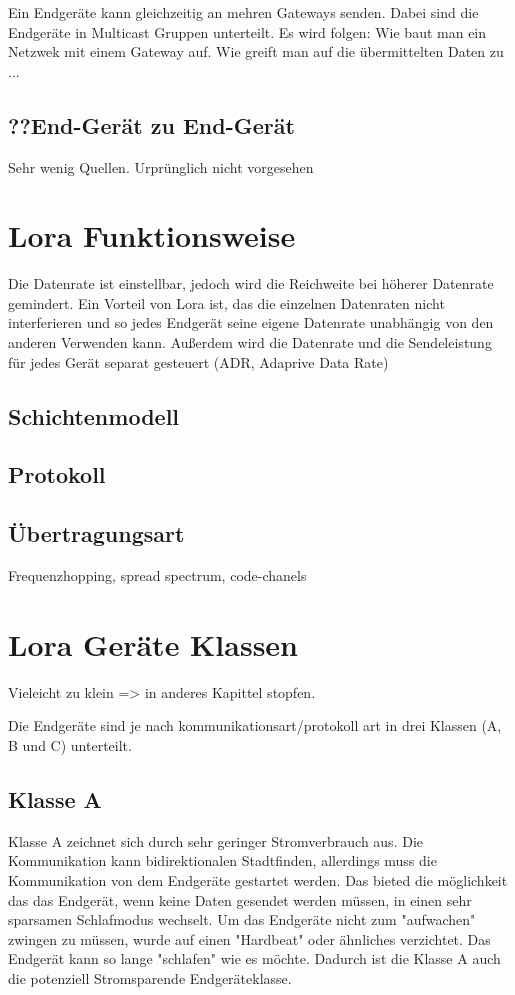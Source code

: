 \documentclass[a4paper,12pt]{article}
\begin{document}
    Ein Endgeräte kann gleichzeitig an mehren Gateways senden. Dabei sind die Endgeräte in Multicast Gruppen unterteilt.
        \cite{TheThing}
        \cite{WhatIsLoRa}
        \cite{LoRaSpec}
        \cite{RFC8376}
    \newline{}\newline{} Es wird folgen: Wie baut man ein Netzwek mit einem Gateway auf. Wie greift man auf die übermittelten Daten zu ...
    \subsection{??End-Gerät zu End-Gerät}
    Sehr wenig Quellen. Urprünglich nicht vorgesehen
    \section{Lora Funktionsweise}
    Die Datenrate ist einstellbar, jedoch wird die Reichweite bei höherer Datenrate gemindert. Ein Vorteil von Lora ist, das die einzelnen Datenraten nicht interferieren und so jedes Endgerät seine eigene Datenrate unabhängig von den anderen Verwenden kann.
    Außerdem wird die Datenrate und die Sendeleistung für jedes Gerät separat gesteuert (ADR, Adaprive Data Rate)
        \cite{RFC8376}
        \cite{LoRaSpec}
    \subsection{Schichtenmodell}
    \subsection{Protokoll}
    \subsection{Übertragungsart}
    Frequenzhopping, spread spectrum, code-chanels
    \section{Lora Geräte Klassen}
    Vieleicht zu klein => in anderes Kapittel stopfen.

    \newline


    Die Endgeräte sind je nach kommunikationsart/protokoll art in drei Klassen (A, B und C) unterteilt. 
        \cite{RFC8376}
        \cite{LoraClasses}
    \subsection{Klasse A}
    Klasse A zeichnet sich durch sehr geringer Stromverbrauch aus. Die Kommunikation kann bidirektionalen Stadtfinden, allerdings muss die Kommunikation von dem Endgeräte gestartet werden. Das bieted die möglichkeit das das Endgerät, wenn keine Daten gesendet werden müssen, in einen sehr
    sparsamen Schlafmodus wechselt. Um das Endgeräte nicht zum "aufwachen" zwingen zu müssen, wurde auf einen "Hardbeat" oder ähnliches verzichtet. Das Endgerät kann so lange "schlafen" wie es möchte. Dadurch ist die Klasse A auch die potenziell Stromsparende Endgeräteklasse.
    
\end{document}
